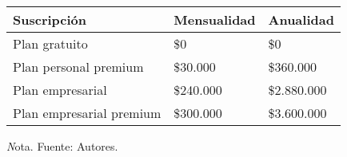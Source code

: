 \begin{adjustbox}{
            center,
            caption=[{Precios de suscripción.}]{Precios de suscripción mensual y anual },
            label={PrecioPeriodos},
            nofloat=table, vspace={20px}}
            {
            \begin{threeparttable}
                \begin{tabular}{|p{7cm}|p{4cm}|p{4cm}|}
                    \hline
                    \rowcolor[HTML]{D9EAD3}
                    Suscripción & Mensualidad & Anualidad \\ \hline
                    Plan gratuito & \$0 & \$0 \\ \hline
                    Plan personal premium & \$30.000 & \$360.000 \\ \hline
                    Plan empresarial & \$240.000 & \$2.880.000 \\ \hline
                    Plan empresarial premium & \$300.000 & \$3.600.000 \\ \hline
                \end{tabular}%
                \begin{tablenotes}
                    \vspace{2mm}
                    \textit Nota. Fuente: Autores.
                \end{tablenotes}
            \end{threeparttable}
    }
\end{adjustbox}